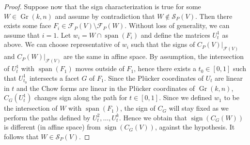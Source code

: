 \documentclass[10pt,a4paper]{amsart}
\DeclareMathOperator{\Gr}{Gr}
\DeclareMathOperator{\sign}{sign}
\DeclareMathOperator{\spanv}{span}
\newcommand{\mF}{\mathcal{F}}
\newcommand{\mS}{\mathcal{S}}
\begin{document}
\begin{proof}
    \vspace{5pt}
    Suppose now that the sign characterization is true for some $W\in \Gr(k,n)$ and assume by contradiction that $W\not\in \mS_P(V)$. Then there exists some face $F_i\in \mF_P(V)\setminus \mF_P(W)$. Without loss of generality, we can assume that $i=1$. Let $w_i = W\cap \spanv(F_i)$ and define the matrices $U_t^1$ as above. 
    We can choose representative of $w_i$ such that the signs of $C_P(V)|_{\mF(V)}$ and $C_P(W)|_{\mF(V)}$ are the same in affine space.
    By assumption, the intersection of $U_t^1$ with $\spanv(F_1)$ moves outside of $F_1$, hence there exists a $t_0\in [0,1]$ such that $U^1_{t_0}$ intersects a facet $G$ of $F_1$. Since the Pl\"ucker coordinates of $U_t$ are linear in $t$ and the Chow forms are linear in the Pl\"ucker coordinates of $\Gr(k,n)$, $C_G(U^1_t)$ changes sign along the path for $t\in [0,1]$. Since we defined $w_1$ to be the intersection of $W$ with $\spanv(F_1)$, the sign of $C_G$ will stay fixed as we perform the paths defined by $U^2_t, \ldots, U^k_t$. Hence we obtain that $\sign(C_G(W))$ is different (in affine space) from $\sign(C_G(V))$, against the hypothesis. It follows that $W\in \mS_P(V)$.
\end{proof}
\end{document}
